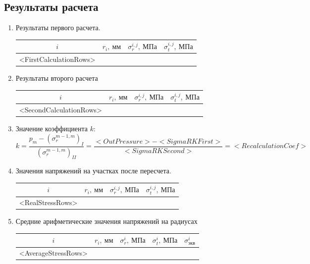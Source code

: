 \documentclass[a4paper,10pt]{article}
\begin{document}
\subsection{Результаты расчета}
\begin{enumerate}

\item Результаты первого расчета.

\begin{center}
\begin{tabular}{|c|c|c|c|}
\hline 
$i$ & $r_i,\ мм$ & $\sigma_r^{i,j},\ МПа$ & $\sigma_t^{i,j},\ МПа$ \\ 
\hline 

<FirstCalculationRows>
\end{tabular} 
\end{center}

\item Результаты второго расчета

\begin{center}
\begin{tabular}{|c|c|c|c|}
\hline 
$i$ & $r_i,\ мм$ & $\sigma_r^{i,j},\ МПа$ & $\sigma_t^{i,j},\ МПа$ \\ 
\hline 

<SecondCalculationRows>
\end{tabular} 
\end{center}

\item Значение коэффициента $k$:
\[k = \frac{p_m - (\sigma_r^{m-1, m})_I}{(\sigma_r^{m-1, m})_{II}} = 
\frac{<OutPressure> - <SigmaRKFirst>}{<SigmaRKSecond>} = <RecalculationCoef>\]

\item Значения напряжений на участках после пересчета.

\begin{center}
\begin{tabular}{|c|c|c|c|}
\hline 
$i$ & $r_i,\ мм$ & $\sigma_r^{i,j},\ МПа$ & $\sigma_t^{i,j},\ МПа$ \\ 
\hline 

<RealStressRows>
\end{tabular} 
\end{center}

\item Средние арифметические значения напряжений на радиусах

\begin{center}
\begin{tabular}{|c|c|c|c|c|}
\hline 
$i$ & $r_i,\ мм$ & $\sigma_r^{i},\ МПа$ & $\sigma_t^{i},\ МПа$ & $\sigma_{экв}^i$ \\ 
\hline 
<AverageStressRows>
\end{tabular} 
\end{center}


\end{enumerate}
\end{document}
